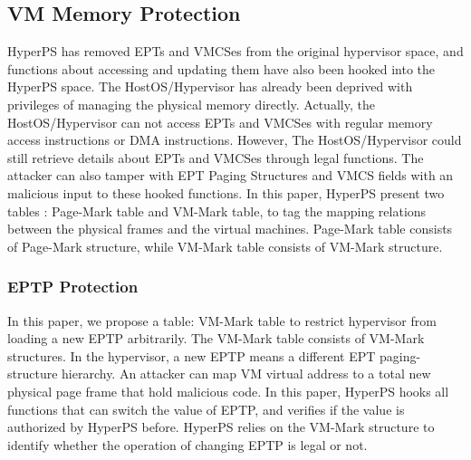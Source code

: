 
\subsection{VM Memory Protection}%
\label{sub:vm_memory_protection}

HyperPS has removed EPTs and VMCSes from the original hypervisor space, and functions about accessing and updating them have also been hooked into the HyperPS space. 
The HostOS/Hypervisor has already been deprived with privileges of managing the physical memory directly. Actually, the HostOS/Hypervisor can not access EPTs and VMCSes with regular memory access instructions or DMA instructions. 
However, The HostOS/Hypervisor could still retrieve details about EPTs and VMCSes through legal functions. 
The attacker can also tamper with EPT Paging Structures and VMCS fields with an malicious input to these hooked functions.
In this paper, HyperPS present two tables : Page-Mark table and VM-Mark table, to tag the mapping relations between the physical frames and the virtual machines. Page-Mark table consists of Page-Mark structure, while VM-Mark table consists of VM-Mark structure.

\subsubsection{EPTP Protection}%
\label{ssub:eptp_protection}
In this paper, we propose a table: VM-Mark table to restrict hypervisor from loading a new EPTP arbitrarily.
The VM-Mark table consists of VM-Mark structures. 
In the hypervisor, a new EPTP means a different EPT paging-structure hierarchy. An attacker can map VM virtual address to a total new physical page frame that hold malicious code. In this paper, HyperPS hooks all functions that can switch the value of EPTP, and verifies if the value is authorized by HyperPS before. HyperPS relies on the VM-Mark structure to identify whether the operation of changing EPTP is legal or not. 

